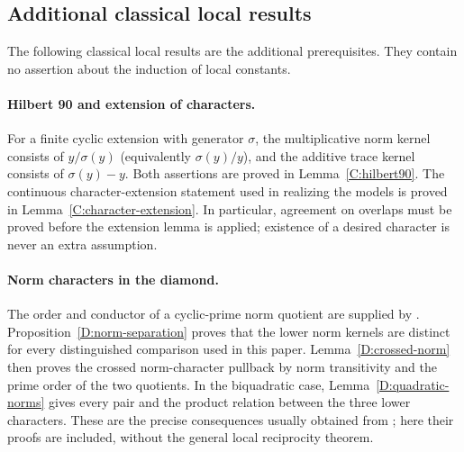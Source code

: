 \documentclass[11pt]{amsart}
\theoremstyle{definition}
\theoremstyle{remark}
\begin{document}
\subsection{Additional classical local results}\label{U:classical}
The following classical local results are the additional prerequisites.
They contain no assertion about the induction of local constants.

\paragraph{Hilbert 90 and extension of characters.}
For a finite cyclic extension with generator $\sigma$, the multiplicative
norm kernel consists of $y/\sigma(y)$ (equivalently $\sigma(y)/y$), and
the additive trace kernel consists of $\sigma(y)-y$.
Both assertions are proved in Lemma~\ref{C:hilbert90}.
The continuous character-extension statement used in realizing the
models is proved in Lemma~\ref{C:character-extension}. In particular,
agreement on overlaps must be proved before the extension lemma is
applied; existence of a desired character is never an extra assumption.

\paragraph{Norm characters in the diamond.}
The order and conductor of a cyclic-prime norm quotient are supplied by
\cite[Corollary~3.9]{Ueda}. Proposition~\ref{D:norm-separation} proves
that the lower norm kernels are distinct for every distinguished
comparison used in this paper. Lemma~\ref{D:crossed-norm} then proves
the crossed norm-character pullback by norm transitivity and the
prime order of the two quotients. In the biquadratic case,
Lemma~\ref{D:quadratic-norms} gives every pair and the product relation
between the three lower characters. These are the precise consequences
usually obtained from \cite[Chapters~XIII--XIV]{Serre}; here their proofs
are included, without the general local reciprocity theorem.
\end{document}
